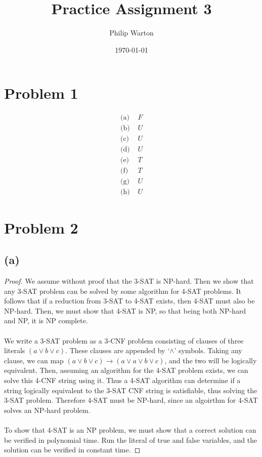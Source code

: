 \documentclass{article}
\theoremstyle{definition}
\begin{document}
\title{Practice Assignment 3}
\author{Philip Warton}
\date{\today}
\maketitle

\section*{Problem 1}
\begin{align*}
    \text{(a) }&F\\
    \text{(b) }&U\\
    \text{(c) }&U\\
    \text{(d) }&U\\
    \text{(e) }&T\\
    \text{(f) }&T\\
    \text{(g) }&U\\
    \text{(h) }&U
\end{align*}

\section*{Problem 2}
\subsection*{(a)}
    \begin{proof}
        We assume without proof that the 3-SAT is NP-hard. 
        Then we show that any 3-SAT problem can be solved by some algorithm for 4-SAT 
        problems. It follows that if a reduction from 3-SAT to 4-SAT exists, then 4-SAT
        must also be NP-hard. Then, we must show that 4-SAT is NP, so that being both
        NP-hard and NP, it is NP complete.\\\\
        We write a 3-SAT problem as a 3-CNF problem consisting of clauses of three literals $(a \vee b \vee c)$.
        These clauses are appended by `$\wedge$' symbols. Taking any clause, we can map $(a \vee b \vee c) \rightarrow (a \vee a \vee b \vee c)$,
        and the two will be logically equivalent. Then, assuming an algorithm for the 4-SAT problem exists, we can solve this 4-CNF string using it.
        Thus a 4-SAT algorithm can determine if a string logically equivalent to the 3-SAT CNF string is satisfiable, thus solving the 3-SAT problem.
        Therefore 4-SAT must be NP-hard, since an algoirthm for 4-SAT solves an NP-hard problem.\\\\
        To show that 4-SAT is an NP problem, we must show that a correct solution can be verified in polynomial time. Run the literal of true and false variables,
        and the solution can be verified in constant time.
    \end{proof}
\end{document}
